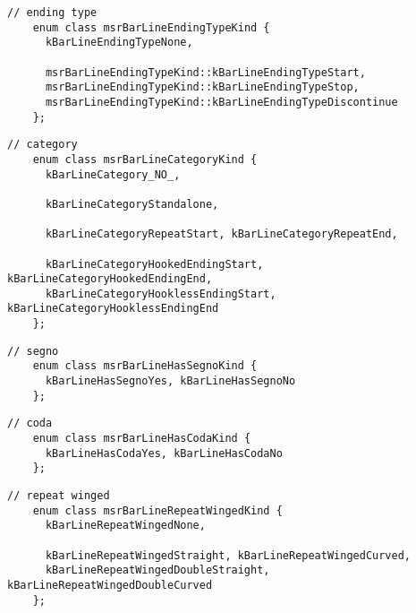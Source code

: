 \begin{lstlisting}[language=CPlusPlus]
    // ending type
    enum class msrBarLineEndingTypeKind {
      kBarLineEndingTypeNone,

      msrBarLineEndingTypeKind::kBarLineEndingTypeStart,
      msrBarLineEndingTypeKind::kBarLineEndingTypeStop,
      msrBarLineEndingTypeKind::kBarLineEndingTypeDiscontinue
    };
\end{lstlisting}

\begin{lstlisting}[language=CPlusPlus]
    // category
    enum class msrBarLineCategoryKind {
      kBarLineCategory_NO_,

      kBarLineCategoryStandalone,

      kBarLineCategoryRepeatStart, kBarLineCategoryRepeatEnd,

      kBarLineCategoryHookedEndingStart, kBarLineCategoryHookedEndingEnd,
      kBarLineCategoryHooklessEndingStart, kBarLineCategoryHooklessEndingEnd
    };
\end{lstlisting}

\begin{lstlisting}[language=CPlusPlus]
    // segno
    enum class msrBarLineHasSegnoKind {
      kBarLineHasSegnoYes, kBarLineHasSegnoNo
    };
\end{lstlisting}

\begin{lstlisting}[language=CPlusPlus]
    // coda
    enum class msrBarLineHasCodaKind {
      kBarLineHasCodaYes, kBarLineHasCodaNo
    };

\end{lstlisting}

\begin{lstlisting}[language=CPlusPlus]
    // repeat winged
    enum class msrBarLineRepeatWingedKind {
      kBarLineRepeatWingedNone,

      kBarLineRepeatWingedStraight, kBarLineRepeatWingedCurved,
      kBarLineRepeatWingedDoubleStraight, kBarLineRepeatWingedDoubleCurved
    };
\end{lstlisting}

